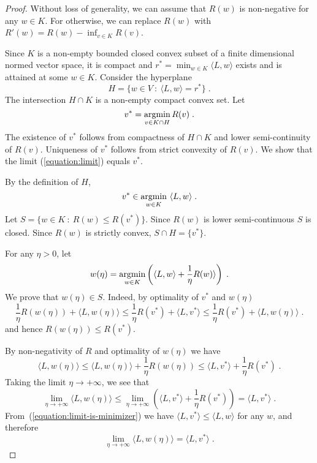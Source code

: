 \begin{proof}
Without loss of generality, we can assume that $R(w)$ is non-negative for any $w \in K$.
For otherwise, we can replace $R(w)$ with $R'(w) = R(w) - \inf_{v \in K} R(v)$.

Since $K$ is a non-empty bounded closed convex subset of a finite dimensional normed vector space, it is compact
and $r^* = \min_{w \in K} \langle L, w \rangle$ exists and is attained at some $w \in K$. Consider the hyperplane
$$
H = \{ w \in V ~:~ \langle L, w \rangle = r^* \} \; .
$$
The intersection $H \cap K$ is a non-empty compact convex set.
Let
$$
v^* = \operatorname*{argmin}_{v \in K \cap H} R(v) \; .
$$
The existence of $v^*$ follows from compactness of $H \cap K$ and lower
semi-continuity of $R(v)$.  Uniqueness of $v^*$ follows from
strict convexity of $R(v)$. We show that the limit (\ref{equation:limit})
equals $v^*$.

By the definition of $H$,
\begin{equation}
\label{equation:limit-is-minimizer}
v^* \in \operatorname*{argmin}_{w \in K} \ \langle L, w \rangle \; .
\end{equation}
Let $S = \{ w \in K ~:~ R(w) \le R(v^*) \}$. Since $R(w)$ is lower semi-continuous $S$
is closed. Since $R(w)$ is strictly convex, $S \cap H = \{v^*\}$.

For any $\eta > 0$, let
$$
w(\eta) = \operatorname*{argmin}_{w \in K} \left( \langle L, w \rangle + \frac{1}{\eta} R(w) \rangle \right) \; .
$$
We prove that $w(\eta) \in S$. Indeed, by optimality of $v^*$ and $w(\eta)$
$$
\frac{1}{\eta} R(w(\eta))  + \langle L, w(\eta) \rangle
\le
\frac{1}{\eta} R(v^*)  + \langle L, v^* \rangle
\le
\frac{1}{\eta} R(v^*)  + \langle L, w(\eta) \rangle \; .
$$
and hence $R(w(\eta)) \le R(v^*)$.

By non-negativity of $R$ and optimality of $w(\eta)$ we have
$$
\langle L, w(\eta) \rangle
\le \langle L, w(\eta) \rangle + \frac{1}{\eta} R(w(\eta))
\le \langle L, v^* \rangle + \frac{1}{\eta} R(v^*) \; .
$$
Taking the limit $\eta \to +\infty$, we see that
$$
\lim_{\eta \to +\infty} \langle L, w(\eta) \rangle \le
\lim_{\eta \to +\infty} \left( \langle L, v^* \rangle + \frac{1}{\eta} R(v^*) \right)
= \langle L, v^* \rangle \; .
$$
From~(\ref{equation:limit-is-minimizer}) we have
$\langle L, v^* \rangle \le \langle L, w \rangle$ for any $w$, and therefore
\begin{equation}
\label{equation:limit-equality}
\lim_{\eta \to +\infty} \langle L, w(\eta) \rangle = \langle L, v^* \rangle \; .
\end{equation}


\end{proof}
